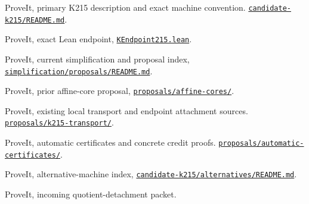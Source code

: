 \documentclass[11pt,letterpaper]{article}
\theoremstyle{definition}\newtheorem{definition}[theorem]{Definition}
\begin{document}
\begin{enumerate}[label={[\arabic*]}]
\item ProveIt, primary K215 description and exact machine convention.\newline
\href{https://github.com/VladimirReshetnikov/ProveIt/blob/56e487ce8fa4cf63ad169ffe0cd2944e9fc62dd3/Computability/BusyBeaver/Research/ZFC/candidate-k215/README.md}{\texttt{candidate-k215/README.md}}.
\item ProveIt, exact Lean endpoint,
\href{https://github.com/VladimirReshetnikov/ProveIt/blob/56e487ce8fa4cf63ad169ffe0cd2944e9fc62dd3/Computability/BusyBeaver/Lean/BusyBeaver/ZFC/KEndpoint215.lean}{\texttt{KEndpoint215.lean}}.
\item ProveIt, current simplification and proposal index,
\href{https://github.com/VladimirReshetnikov/ProveIt/blob/56e487ce8fa4cf63ad169ffe0cd2944e9fc62dd3/Computability/BusyBeaver/Research/ZFC/k225-formal/verification/k215/simplification/proposals/README.md}{\texttt{simplification/proposals/README.md}}.
\item ProveIt, prior affine-core proposal,
\href{https://github.com/VladimirReshetnikov/ProveIt/tree/56e487ce8fa4cf63ad169ffe0cd2944e9fc62dd3/Computability/BusyBeaver/Research/ZFC/k225-formal/verification/k215/simplification/proposals/affine-cores}{\texttt{proposals/affine-cores/}}.
\item ProveIt, existing local transport and endpoint attachment sources.\newline
\href{https://github.com/VladimirReshetnikov/ProveIt/tree/56e487ce8fa4cf63ad169ffe0cd2944e9fc62dd3/Computability/BusyBeaver/Research/ZFC/k225-formal/verification/k215/simplification/proposals/k215-transport}{\texttt{proposals/k215-transport/}}.
\item ProveIt, automatic certificates and concrete credit proofs.\newline
\href{https://github.com/VladimirReshetnikov/ProveIt/tree/56e487ce8fa4cf63ad169ffe0cd2944e9fc62dd3/Computability/BusyBeaver/Research/ZFC/k225-formal/verification/k215/simplification/proposals/automatic-certificates}{\texttt{proposals/automatic-certificates/}}.
\item ProveIt, alternative-machine index,
\href{https://github.com/VladimirReshetnikov/ProveIt/blob/56e487ce8fa4cf63ad169ffe0cd2944e9fc62dd3/Computability/BusyBeaver/Research/ZFC/candidate-k215/alternatives/README.md}{\texttt{candidate-k215/alternatives/README.md}}.
\item ProveIt, incoming quotient-detachment packet.\newline

\end{enumerate}
\end{document}
